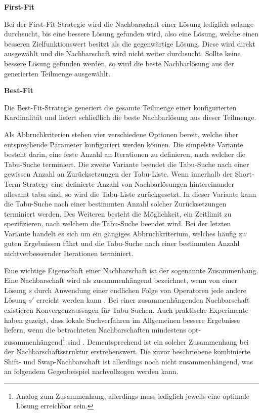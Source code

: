 \textbf{First-Fit}

Bei der First-Fit-Strategie wird die Nachbarschaft einer Lösung lediglich solange durchsucht, bis eine bessere
Lösung gefunden wird, also eine Lösung, welche einen besseren Zielfunktionswert besitzt als die gegenwärtige Lösung.
Diese wird direkt ausgewählt und die Nachbarschaft wird nicht weiter durchsucht. Sollte keine bessere Lösung gefunden werden, so wird die beste Nachbarlösung aus der generierten Teilmenge ausgewählt.

\textbf{Best-Fit}

Die Best-Fit-Strategie generiert die gesamte Teilmenge einer konfigurierten Kardinalität und liefert schließlich die
beste Nachbarlösung aus dieser Teilmenge.\newline

Als Abbruchkriterien stehen vier verschiedene Optionen bereit, welche über entsprechende Parameter konfiguriert werden können. Die simpelste Variante besteht darin, eine feste Anzahl an Iterationen zu definieren, nach welcher die Tabu-Suche terminiert. Die zweite Variante beendet die Tabu-Suche nach einer gewissen Anzahl an Zurücksetzungen der Tabu-Liste. Wenn innerhalb der Short-Term-Strategy eine definierte Anzahl von Nachbarlösungen hintereinander allesamt tabu sind, so wird die Tabu-Liste zurückgesetzt. In dieser Variante kann die Tabu-Suche nach einer bestimmten Anzahl solcher Zurücksetzungen terminiert werden. Des Weiteren besteht die Möglichkeit, ein Zeitlimit
zu spezifizieren, nach welchem die Tabu-Suche beendet wird. Bei der letzten Variante handelt es sich um ein gängiges Abbruchkriterium, welches häufig zu guten Ergebnissen führt und die Tabu-Suche nach einer bestimmten Anzahl nichtverbessernder Iterationen terminiert.

Eine wichtige Eigenschaft einer Nachbarschaft ist der sogenannte Zusammenhang. Eine Nachbarschaft wird als zusammenhängend bezeichnet, wenn von einer Lösung $s$ durch Anwendung einer endlichen Folge von Operatoren jede andere Lösung $s'$ erreicht
werden kann \cite{Brucker2006}. Bei einer zusammenhängenden Nachbarschaft existieren Konvergenzaussagen für Tabu-Suchen.
Auch praktische Experimente haben gezeigt, dass lokale Suchverfahren im Allgemeinen bessere Ergebnisse
liefern, wenn die betrachteten Nachbarschaften mindestens opt-zusammenhängend\footnote{Analog zum Zusammenhang, allerdings muss lediglich jeweils eine optimale Lösung erreichbar sein.} sind \cite{Knust2017}.
Dementsprechend ist ein solcher Zusammenhang bei der Nachbarschaftsstruktur erstrebenswert.
Die zuvor beschriebene kombinierte Shift- und Swap-Nachbarschaft ist allerdings noch nicht zusammenhängend,
was an folgendem Gegenbeispiel nachvollzogen werden kann.

